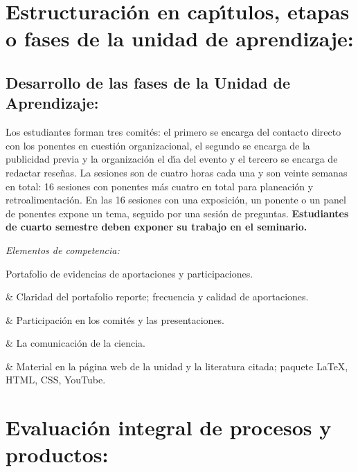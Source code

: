 \documentclass[10 pt]{article}
\begin{document}
\newpage
\section{Estructuraci\'{o}n en cap\'{\i}tulos, etapas o fases de la unidad de
  aprendizaje:}
\subsection{Desarrollo de las fases de la Unidad de Aprendizaje:}

Los estudiantes forman tres comit\'{e}s: el primero se encarga del
contacto directo con los ponentes en cuesti\'{o}n organizacional, el
segundo se encarga de la publicidad previa y la organizaci\'{o}n el d\'{\i}a
del evento y el tercero se encarga de redactar rese\~{n}as.  La sesiones
son de cuatro horas cada una y son veinte semanas en total: 16
sesiones con ponentes m\'{a}s cuatro en total para planeaci\'{o}n y
retroalimentaci\'{o}n. En las 16 sesiones con una exposici\'{o}n, un ponente o
un panel de ponentes expone un tema, seguido por una sesi\'{o}n de
preguntas. {\bf Estudiantes de cuarto semestre deben exponer su
  trabajo en el seminario.}

{\em Elementos de competencia:}


Portafolio de evidencias de aportaciones y participaciones.

& Claridad del portafolio reporte; frecuencia y calidad de aportaciones.

& Participaci\'{o}n en los comit\'{e}s y las presentaciones.

& La comunicaci\'{o}n de la ciencia.

& Material en la p\'{a}gina web de la unidad y la
literatura citada; paquete {\LaTeX}, HTML, CSS, YouTube.



  \section{Evaluaci\'{o}n integral de procesos y productos:}
  
\end{document}
